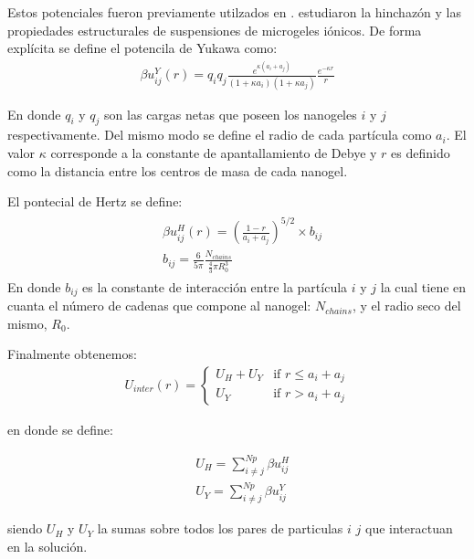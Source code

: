 	
	
	Estos potenciales fueron previamente utilzados en \cite{weyer2018concentration}. \citet{weyer2018concentration} estudiaron la hinchaz\'on y las propiedades estructurales de suspensiones de microgeles i\'onicos.
	De forma expl\'icita se define el potencila de Yukawa como: 
	\begin{align}
		\beta u^Y_{ij}(r) = q_i q_j \frac{e^{\kappa(a_i + a_j)}}{(1 +\kappa a_i)(1 + \kappa a_j)} \frac{e^{-\kappa r}}{r} 
		\label{eq:mc:yukawa}
	\end{align}
	
	\noindent En donde $q_i$ y $q_j$ son las cargas netas que poseen los nanogeles $i$ y $j$ respectivamente. Del mismo modo se define el radio de cada part\'icula como $a_i$. El valor $\kappa$ corresponde a la constante de apantallamiento de Debye y $r$ es definido como la distancia entre los centros de masa de cada nanogel.
	
	El pontecial de Hertz  se define:
	\begin{align}
		\begin{aligned}
			& \beta u^H_{ij} (r) = \left(\frac{1-r}{a_i + a_j}\right)^{5/2}\times b_{ij} \\
			& b_{ij} = \frac{6}{5\pi}\frac{N_{chains}}{\frac{4}{3}\pi R_0^3}
		\end{aligned}
	\end{align}
	\noindent En donde $b_{ij}$ es la constante de interacci\'on entre la part\'icula $i$ y $j$ la cual tiene en cuanta el n\'umero de cadenas que compone al nanogel: $N_{chains}$, y el radio seco del mismo, $R_0$.
	
	Finalmente obtenemos:
	\begin{align}
		U_{inter}(r) = \begin{cases} U_H + U_Y & \text{if } r \leq a_i + a_j \\ U_Y & \text{if } r > a_i + a_j \end{cases} 
		\label{eq:mc:HY-potential}
	\end{align}
	
	\noindent en donde se define:
	
	\begin{align}
		& U_H = \sum^{Np}_{i \neq j} \beta u^H_{ij} \\
		& U_Y = \sum^{Np}_{i \neq j} \beta u^Y_{ij}
	\end{align}
	
	\noindent siendo $U_H$ y $U_Y$ la sumas sobre todos los pares de particulas $i$ $j$ que interactuan en la soluci\'on.
	
